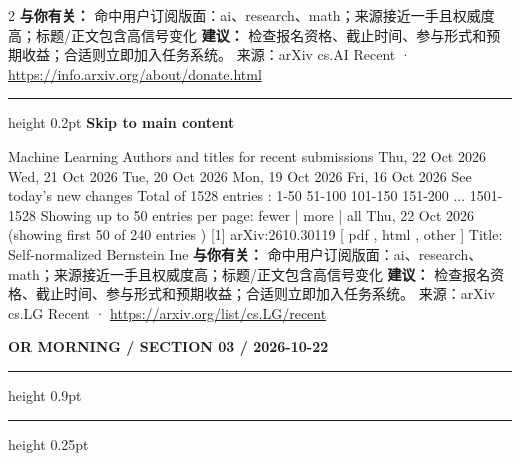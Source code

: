\documentclass[10.5pt]{ctexart}
\begin{document}
\begin{multicols}{2}
\textbf{与你有关：} 命中用户订阅版面：ai、research、math；来源接近一手且权威度高；标题/正文包含高信号变化
\textbf{建议：} 检查报名资格、截止时间、参与形式和预期收益；合适则立即加入任务系统。
{\footnotesize\color{ormuted} 来源：arXiv cs.AI Recent · \url{https://info.arxiv.org/about/donate.html}}
\vspace{2mm}
\hrule height 0.2pt
\vspace{2mm}
{\large\bfseries Skip to main content}\par
Machine Learning Authors and titles for recent submissions Thu, 22 Oct 2026 Wed, 21 Oct 2026 Tue, 20 Oct 2026 Mon, 19 Oct 2026 Fri, 16 Oct 2026 See today's new changes Total of 1528 entries : 1-50 51-100 101-150 151-200 ... 1501-1528 Showing up to 50 entries per page: fewer | more | all Thu, 22 Oct 2026 (showing first 50 of 240 entries ) [1] arXiv:2610.30119 [ pdf , html , other ] Title: Self-normalized Bernstein Ine
\textbf{与你有关：} 命中用户订阅版面：ai、research、math；来源接近一手且权威度高；标题/正文包含高信号变化
\textbf{建议：} 检查报名资格、截止时间、参与形式和预期收益；合适则立即加入任务系统。
{\footnotesize\color{ormuted} 来源：arXiv cs.LG Recent · \url{https://arxiv.org/list/cs.LG/recent}}
\end{multicols}
\newpage
{\small\bfseries OR MORNING / SECTION 03 / 2026-10-22}
\vspace{2mm}
\hrule height 0.9pt
\vspace{1.5mm}
\hrule height 0.25pt
\vspace{4mm}
\end{document}
